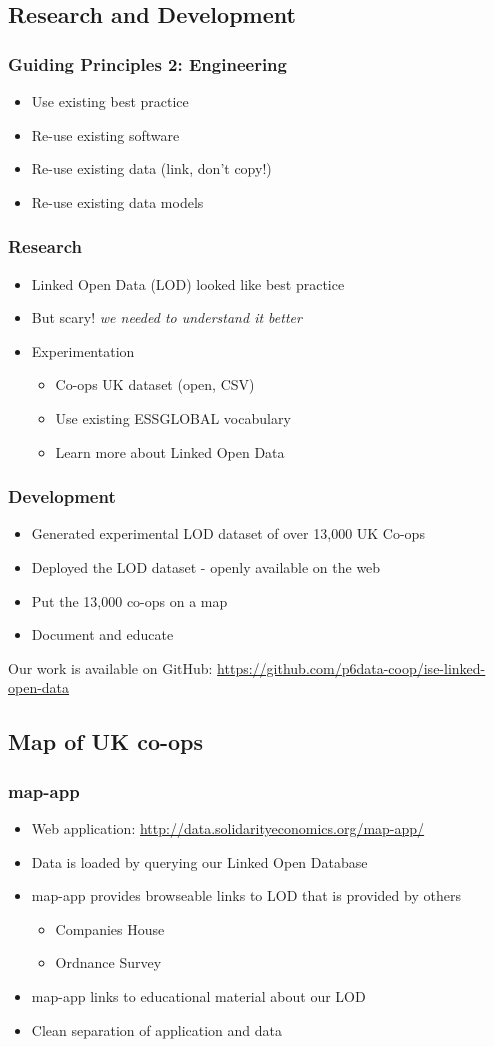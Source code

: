 \subsection{Research and Development}
\frame
{
  \frametitle{Guiding Principles 2: Engineering}
  \begin{itemize}
    \item Use existing best practice
    \item Re-use existing software
    \item Re-use existing data (link, don't copy!)
    \item Re-use existing data models
  \end{itemize}
}
\frame
{
  \frametitle{Research}
  \begin{itemize}
    \item Linked Open Data (LOD) looked like best practice
    \item But scary! {\em we needed to understand it better}
    \item Experimentation
      \begin{itemize}
	\item Co-ops UK dataset (open, CSV)
	\item Use existing ESSGLOBAL vocabulary
	\item Learn more about Linked Open Data
      \end{itemize}
  \end{itemize}
}
\frame
{
  \frametitle{Development}
  \begin{itemize}
    \item Generated experimental LOD dataset of over 13,000 UK Co-ops
    \item Deployed the LOD dataset - openly available on the web
    \item Put the 13,000 co-ops on a map
    \item Document and educate
  \end{itemize}
}
Our work is available on GitHub: \url{https://github.com/p6data-coop/ise-linked-open-data}
\subsection{Map of UK co-ops}
\frame
{
  \frametitle{map-app}
  \begin{itemize}
    \item<1-> Web application: \url{http://data.solidarityeconomics.org/map-app/}
    \item<2-> Data is loaded by querying our Linked Open Database
    \item<3-> map-app provides browseable links to LOD that is provided by others
      \begin{itemize}
	\item<3-> Companies House
	\item<3-> Ordnance Survey
      \end{itemize}
    \item<4-> map-app links to educational material about our LOD
    \item<article> Clean separation of application and data
  \end{itemize}
}


